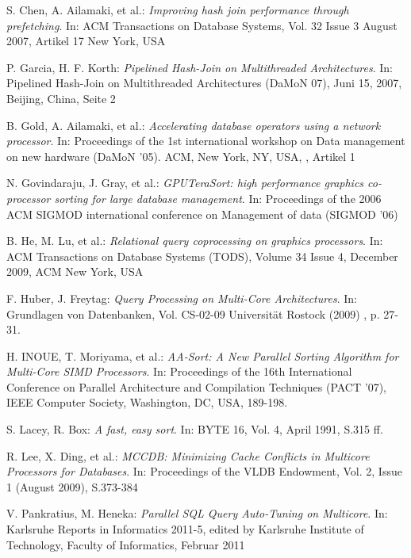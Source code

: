 \begin{thebibliography}{-----------}
 S. Chen, A. Ailamaki, et al.: {\textit{Improving hash join performance through prefetching}}. In: ACM Transactions on Database Systems, Vol. 32 Issue 3 August 2007, Artikel 17 New York, USA

 P. Garcia, H. F. Korth: {\textit{Pipelined Hash-Join on Multithreaded Architectures}}. In: Pipelined Hash-Join on Multithreaded Architectures (DaMoN 07), Juni 15, 2007, Beijing, China, Seite 2

 B. Gold, A. Ailamaki, et al.: {\textit{Accelerating database operators using a network processor}}. In: Proceedings of the 1st international workshop on Data management on new hardware (DaMoN '05). ACM, New York, NY, USA, , Artikel 1 

 N. Govindaraju, J. Gray, et al.: {\textit{GPUTeraSort: high performance graphics co-processor sorting for large database management}}. In: Proceedings of the 2006 ACM SIGMOD international conference on Management of data (SIGMOD '06)

 B. He, M. Lu, et al.: {\textit{Relational query coprocessing on graphics processors}}. In: ACM Transactions on Database Systems (TODS), Volume 34 Issue 4, December 2009, ACM New York, USA 

 F. Huber, J. Freytag: {\textit{Query Processing on Multi-Core Architectures}}. In: Grundlagen von Datenbanken, Vol. CS-02-09 Universität Rostock (2009) , p. 27-31.

 H. INOUE, T. Moriyama, et al.: {\textit{AA-Sort: A New Parallel Sorting Algorithm for Multi-Core SIMD Processors}}. In: Proceedings of the 16th International Conference on Parallel Architecture and Compilation Techniques (PACT '07), IEEE Computer Society, Washington, DC, USA, 189-198.

 S. Lacey, R. Box: {\textit{A fast, easy sort}}. In: BYTE 16, Vol. 4, April 1991, S.315 ff.

 R. Lee, X. Ding, et al.: {\textit{MCCDB: Minimizing Cache Conflicts in Multicore Processors for Databases}}. In: Proceedings of the VLDB Endowment, Vol. 2, Issue 1 (August 2009), S.373-384

 V. Pankratius, M. Heneka: {\textit{Parallel SQL Query Auto-Tuning on Multicore}}. In: Karlsruhe Reports in Informatics 2011-5, edited by Karlsruhe Institute of Technology, Faculty of Informatics, Februar 2011


\end{thebibliography}
